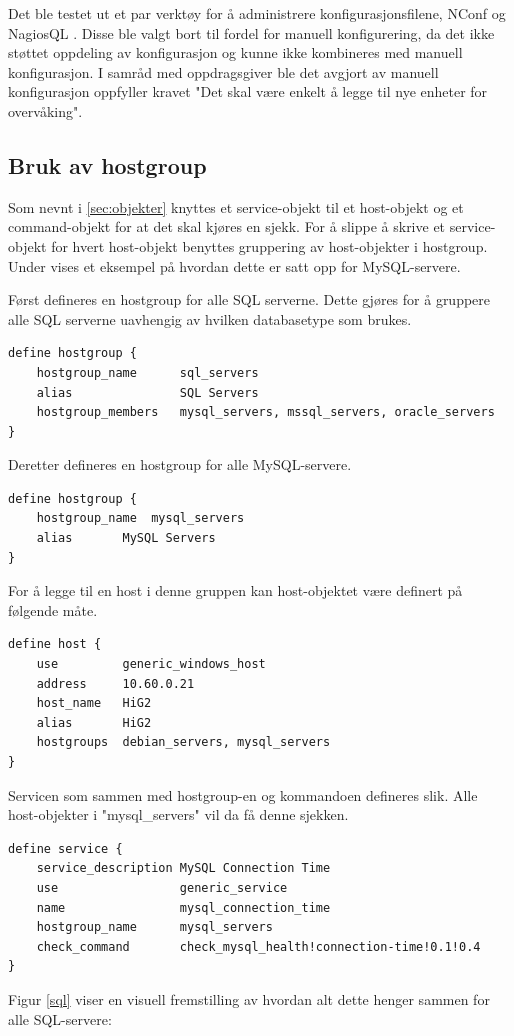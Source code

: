 Det ble testet ut et par verktøy for å administrere konfigurasjonsfilene, NConf \cite{nconf} og NagiosQL \cite{nagiosql}. Disse ble valgt bort til fordel for manuell konfigurering, da det ikke støttet oppdeling av konfigurasjon og kunne ikke kombineres med manuell konfigurasjon. I samråd med oppdragsgiver ble det avgjort av manuell konfigurasjon oppfyller kravet "Det skal være enkelt å legge til nye enheter for overvåking".

\subsection{Bruk av hostgroup}
Som nevnt i \ref{sec:objekter} knyttes et service-objekt til et host-objekt og et command-objekt for at det skal kjøres en sjekk. For å slippe å skrive et service-objekt for hvert host-objekt benyttes gruppering av host-objekter i hostgroup. Under vises et eksempel på hvordan dette er satt opp for MySQL-servere. 

Først defineres en hostgroup for alle SQL serverne. Dette gjøres for å gruppere alle SQL serverne uavhengig av hvilken databasetype som brukes. 
\begin{lstlisting}[style=example]
define hostgroup {
	hostgroup_name		sql_servers
	alias 				SQL Servers
	hostgroup_members	mysql_servers, mssql_servers, oracle_servers
}
\end{lstlisting}
Deretter defineres en hostgroup for alle MySQL-servere.
\begin{lstlisting}[style=example]
define hostgroup {
    hostgroup_name 	mysql_servers
    alias 		MySQL Servers
}
\end{lstlisting}
For å legge til en host i denne gruppen kan host-objektet være definert på følgende måte.
\begin{lstlisting}[style=example]
define host {
    use			generic_windows_host
    address		10.60.0.21
    host_name	HiG2
    alias		HiG2
    hostgroups	debian_servers, mysql_servers
}
\end{lstlisting}
Servicen som sammen med hostgroup-en og kommandoen defineres slik. Alle host-objekter i "mysql\_servers" vil da få denne sjekken.
\begin{lstlisting}[style=example]
define service {
    service_description	MySQL Connection Time
    use		 			generic_service
    name 				mysql_connection_time
    hostgroup_name 		mysql_servers
    check_command 		check_mysql_health!connection-time!0.1!0.4
}
\end{lstlisting}

Figur \ref{sql} viser en visuell fremstilling av hvordan alt dette henger sammen for alle SQL-servere:

